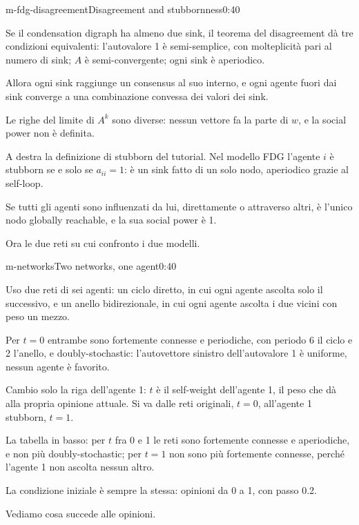 \begin{slide}{m-fdg-disagreement}{Disagreement and stubbornness}{0:40}
  \begin{discorso}
    \item Se il condensation digraph ha almeno due sink, il teorema del {\color{red}} {\color{blue}disagreement} dà tre condizioni equivalenti: l'autovalore 1 è semi-semplice, con molteplicità pari al numero di sink; $A$ è semi-convergente; ogni sink è aperiodico.
    \item Allora ogni sink raggiunge un {\color{red}} {\color{blue}consensus} al suo interno, e ogni agente fuori dai sink converge a una combinazione convessa dei valori dei sink.
    \item Le righe del limite di $A^k$ sono diverse: nessun vettore fa la parte di $w$, e la social power non è definita.
    \item A destra la definizione di stubborn del tutorial. Nel modello FDG l'agente $i$ è stubborn se e solo se $a_{ii}=1$: è un sink fatto di un solo nodo, aperiodico grazie al self-loop.
    \item Se tutti gli agenti sono influenzati da lui, direttamente o attraverso altri, è l'unico nodo globally reachable, e la sua social power è 1.
    \item Ora le due reti su cui confronto i due modelli.
  \end{discorso}
\end{slide}

\begin{slide}{m-networks}{Two networks, one agent}{0:40}
  \begin{discorso}
    \item Uso due reti di sei agenti: un ciclo diretto, in cui ogni agente ascolta solo il successivo, e un anello bidirezionale, in cui ogni agente ascolta i due vicini con peso un mezzo.
    \item Per $t=0$ entrambe sono fortemente connesse e periodiche, con periodo 6 il ciclo e 2 l'anello, e doubly-stochastic: l'autovettore sinistro dell'autovalore 1 è uniforme, nessun agente è favorito.
    \item Cambio solo la riga dell'agente 1: $t$ è il {\color{blue}self-weight dell'agente 1, il} peso che {\color{red} } dà alla propria opinione attuale. Si va dalle reti originali, $t=0$, all'agente 1 stubborn, $t=1$.
    \item La tabella in basso: per $t$ fra 0 e 1 le reti sono fortemente connesse e aperiodiche, e non più doubly-stochastic; per $t=1$ non sono più fortemente connesse, perché l'agente 1 non ascolta nessun altro.
    \item La condizione iniziale è sempre la stessa: opinioni da 0 a 1, con passo 0.2.
    \item Vediamo cosa succede alle opinioni.
  \end{discorso}
\end{slide}

